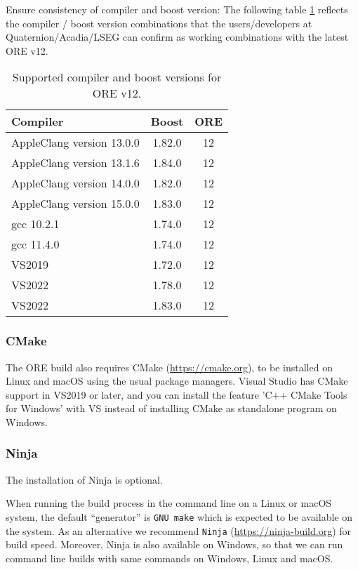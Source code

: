 Ensure consistency of compiler and boost version: The following table \ref{tab:compiler_boost_versions} reflects the compiler / boost
version combinations that the users/developers at Quaternion/Acadia/LSEG can confirm as working combinations with the latest ORE v12.

\begin{table}[hbt]
  \begin{tabular}{|l|c|c|}
    \hline
    Compiler & Boost & ORE \\
    \hline
    AppleClang version 13.0.0 & 1.82.0 & 12\\
    AppleClang version 13.1.6 & 1.84.0 & 12\\
    AppleClang version 14.0.0 & 1.82.0 & 12\\
    AppleClang version 15.0.0 & 1.83.0 & 12\\
    gcc 10.2.1 & 1.74.0 & 12 \\
    gcc 11.4.0 & 1.74.0 & 12 \\
    VS2019 & 1.72.0 & 12 \\
    VS2022 & 1.78.0 & 12 \\
    VS2022 & 1.83.0 & 12 \\
    \hline
  \end{tabular}
  \caption{Supported compiler and boost versions for ORE v12.}
  \label{tab:compiler_boost_versions}
\end{table}

\subsubsection*{CMake}

The ORE build also requires CMake (\url{https://cmake.org}), to be installed on Linux and macOS using the usual package managers.
Visual Studio has CMake support in VS2019 or later, and you can install the feature 'C++ CMake Tools for Windows' with VS instead of
installing CMake as standalone program on Windows.

\subsubsection*{Ninja}

The installation of Ninja is optional.

When running the build process in the command line on a Linux or macOS system, the default ``generator'' is {\tt GNU make} which is
expected to be available on the system. As an alternative we recommend {\tt Ninja} (\url{https://ninja-build.org}) for build speed.
Moreover, Ninja is also available on Windows, so that we can run command line builds with same commands on Windows, Linux and macOS.

